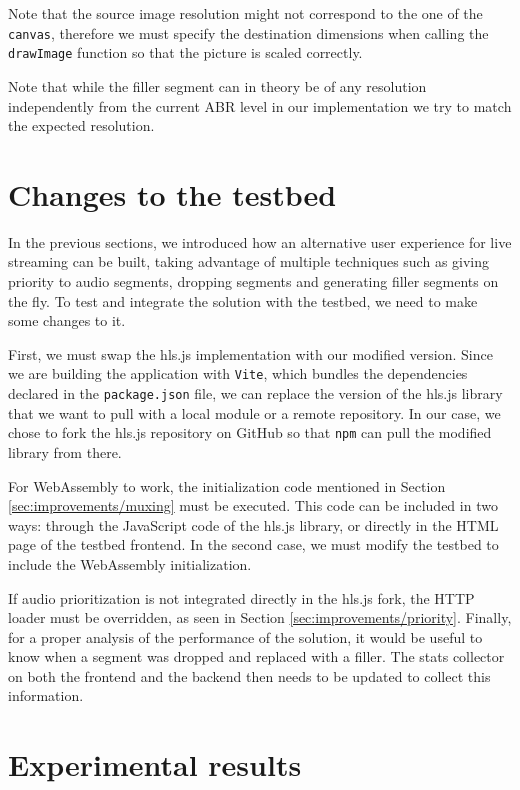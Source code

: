 Note that the source image resolution might not correspond to the one of the \texttt{canvas}, therefore we must specify the destination dimensions when calling the \texttt{drawImage} function so that the picture is scaled correctly.

Note that while the filler segment can in theory be of any resolution independently from the current ABR level in our implementation we try to match the expected resolution.

\section{Changes to the testbed}
\label{sec:improvements/newtestbed}

In the previous sections, we introduced how an alternative user experience for live streaming can be built, taking advantage of multiple techniques such as giving priority to audio segments, dropping segments and generating filler segments on the fly. To test and integrate the solution with the testbed, we need to make some changes to it.

First, we must swap the hls.js implementation with our modified version. Since we are building the application with \texttt{Vite}, which bundles the dependencies declared in the \texttt{package.json} file, we can replace the version of the hls.js library that we want to pull with a local module or a remote repository. In our case, we chose to fork the hls.js repository on GitHub so that \texttt{npm} can pull the modified library from there.

For WebAssembly to work, the initialization code mentioned in Section \ref{sec:improvements/muxing} must be executed. This code can be included in two ways: through the JavaScript code of the hls.js library, or directly in the HTML page of the testbed frontend. In the second case, we must modify the testbed to include the WebAssembly initialization.

If audio prioritization is not integrated directly in the hls.js fork, the HTTP loader must be overridden, as seen in Section \ref{sec:improvements/priority}. Finally, for a proper analysis of the performance of the solution, it would be useful to know when a segment was dropped and replaced with a filler. The stats collector on both the frontend and the backend then needs to be updated to collect this information.

\section{Experimental results}
\label{sec:improvements/results}

